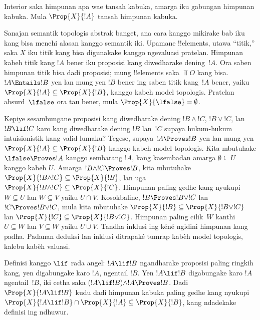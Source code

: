 \documentclass[../../../include/open-logic-section]{subfiles}
\begin{document}
Interior saka himpunan apa wae tansah kabuka, amarga iku gabungan
himpunan kabuka. Mula $\Prop{X}{!A}$ tansah himpunan kabuka.

Sanajan semantik topologis abstrak banget, ana cara kanggo
mikirake bab iku kang bisa menehi alasan kanggo semantik iki. Upamane
!!{element}s, utawa ``titik,'' saka $X$ iku titik kang bisa digunakake
kanggo ngevaluasi pratelan. Himpunan kabeh titik kang $!A$ bener
iku proposisi kang diwedharake dening~$!A$. Ora saben himpunan titik
bisa dadi proposisi; mung !!{element}s saka $\Top{O}$ kang bisa.
$!A \Entails !B$ yen lan mung yen $!B$ bener ing saben titik kang~$!A$
bener, yaiku $\Prop{X}{!A} \subseteq \Prop{X}{!B}$, kanggo kabeh model topologis.
Pratelan absurd~$\lfalse$ ora tau bener, mula
$\Prop{X}{\lfalse} = \emptyset$.

Kepiye sesambungane proposisi kang diwedharake dening $!B \land !C$,
$!B \lor !C$, lan $!B \lif !C$ karo kang diwedharake dening $!B$
lan~$!C$ supaya hukum-hukum intuisionistik kang valid lumaku?
Tegese, supaya $!A \Proves !B$ yen lan mung yen
$\Prop{X}{!A} \subseteq \Prop{X}{!B}$ kanggo kabeh model topologis.
Kita mbutuhake $\lfalse \Proves !A$ kanggo sembarang $!A$, kang
kasembadan amarga $\emptyset \subseteq U$ kanggo kabeh $U$.
Amarga $!B \land !C \Proves !B$, kita mbutuhake
$\Prop{X}{!B \land !C} \subseteq \Prop{X}{!B}$, lan uga
$\Prop{X}{!B \land !C} \subseteq \Prop{X}{!C}$. Himpunan paling gedhe
kang nyukupi $W \subseteq U$ lan $W \subseteq V$ yaiku $U \cap V$.
Kosokbaline, $!B \Proves !B \lor !C$ lan $!C \Proves !B \lor !C$,
mula kita mbutuhake $\Prop{X}{!B} \subseteq \Prop{X}{!B \lor !C}$ lan
$\Prop{X}{!C} \subseteq \Prop{X}{!B \lor !C}$. Himpunan paling cilik~$W$
kanthi $U \subseteq W$ lan $V \subseteq W$ yaiku $U \cup V$.
Tandha inklusi ing kéné ngidini himpunan kang padha.
Padanan deduksi lan inklusi ditrapaké tumrap kabèh model topologis, kalebu kabèh valuasi.

Definisi kanggo $\lif$ rada angel: $!A \lif !B$ ngandharake
proposisi paling ringkih kang, yen digabungake karo $!A$, ngentail $!B$.
Yen $!A \lif !B$ digabungake karo $!A$ ngentail~$!B$, iki cetha saka
$(!A \lif !B) \land !A \Proves !B $. Dadi $\Prop{X}{!A \lif !B}$
kudu dadi himpunan kabuka paling gedhe kang nyukupi
$\Prop{X}{!A \lif !B} \cap \Prop{X}{!A} \subseteq \Prop{X}{!B}$,
kang ndadekake definisi ing ndhuwur.
\end{document}
